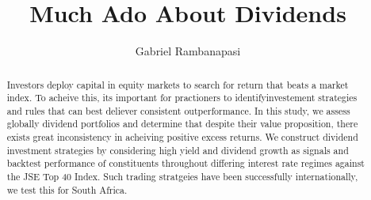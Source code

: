 \documentclass[12pt,preprint, authoryear]{elsarticle}
\numberwithin{equation}{section}
\numberwithin{figure}{section}
\numberwithin{table}{section}
\begin{document}
\begin{frontmatter}  %

\title{Much Ado About Dividends}





\author[Add1]{Gabriel Rambanapasi}





\address[Add1]{Stellenbosch University, Cape Town, South Africa}


\begin{abstract}
\small{
Investors deploy capital in equity markets to search for return that
beats a market index. To acheive this, its important for practioners to
identifyinvestement strategies and rules that can best deliever
consistent outperformance. In this study, we assess globally dividend
portfolios and determine that despite their value proposition, there
exists great inconsistency in acheiving positive excess returns. We
construct dividend investment strategies by considering high yield and
dividend growth as signals and backtest performance of constituents
throughout differing interest rate regimes against the JSE Top 40 Index.
Such trading stratgeies have been successfully internationally, we test
this for South Africa.
}
\end{abstract}

\vspace{1cm}





\vspace{0.5cm}

\end{frontmatter}

\setcounter{footnote}{0}



\pagestyle{fancy}
\chead{}
\lfoot{}
\lhead{}
\cfoot{}


\headsep 35pt %
\end{document}
